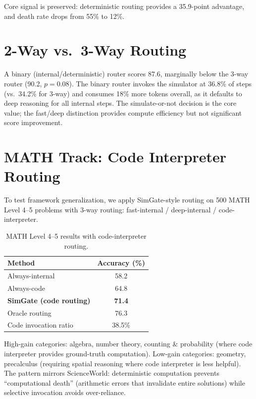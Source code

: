 \documentclass[11pt,a4paper]{article}
\begin{document}
Core signal is preserved: deterministic routing provides a 35.9-point advantage, and death rate drops from 55\% to 12\%.

\section{2-Way vs.\ 3-Way Routing}
\label{app:2v3}

A binary (internal/deterministic) router scores 87.6, marginally below the 3-way router (90.2, $p{=}0.08$).
The binary router invokes the simulator at 36.8\% of steps (vs.\ 34.2\% for 3-way) and consumes 18\% more tokens overall, as it defaults to deep reasoning for all internal steps.
The simulate-or-not decision is the core value; the fast/deep distinction provides compute efficiency but not significant score improvement.

\section{MATH Track: Code Interpreter Routing}
\label{app:math}

To test framework generalization, we apply SimGate-style routing on 500 MATH Level 4--5 problems with 3-way routing: fast-internal / deep-internal / code-interpreter.

\begin{table}[h]
\centering
\small
\begin{tabular}{lc}
\toprule
\textbf{Method} & \textbf{Accuracy (\%)} \\
\midrule
Always-internal & 58.2 \\
Always-code & 64.8 \\
\textbf{SimGate (code routing)} & \textbf{71.4} \\
Oracle routing & 76.3 \\
\midrule
Code invocation ratio & 38.5\% \\
\bottomrule
\end{tabular}
\caption{MATH Level 4--5 results with code-interpreter routing.}
\label{tab:math}
\end{table}

High-gain categories: algebra, number theory, counting \& probability (where code interpreter provides ground-truth computation).
Low-gain categories: geometry, precalculus (requiring spatial reasoning where code interpreter is less helpful).
The pattern mirrors ScienceWorld: deterministic computation prevents ``computational death'' (arithmetic errors that invalidate entire solutions) while selective invocation avoids over-reliance.
\end{document}
